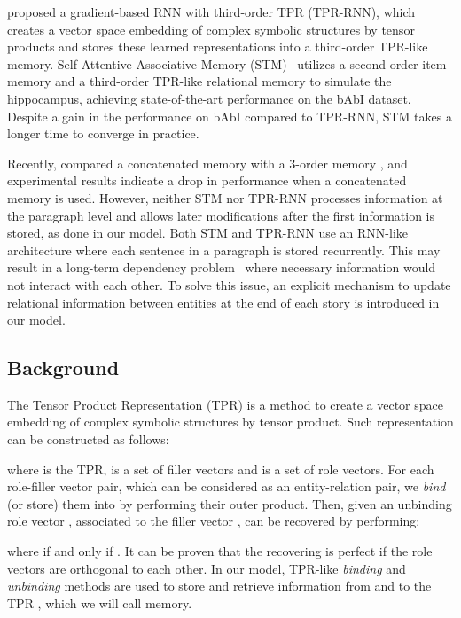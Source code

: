 \documentclass[letterpaper]{article} \usepackage{aaai22}  \usepackage{times}  \usepackage{helvet}  \usepackage{courier}  \usepackage[hyphens]{url}  \usepackage{graphicx} \urlstyle{rm} \def\UrlFont{\rm}  \usepackage{natbib}  \usepackage{caption} \DeclareCaptionStyle{ruled}{labelfont=normalfont,labelsep=colon,strut=off} \frenchspacing  \setlength{\pdfpagewidth}{8.5in}  \setlength{\pdfpageheight}{11in}  \usepackage{algorithm}
\begin{document}
\citet{schlag2018learning} proposed a gradient-based RNN with third-order TPR (TPR-RNN), which creates a vector space embedding of complex symbolic structures by tensor products and stores these learned representations into a third-order TPR-like memory. 
Self-Attentive Associative Memory (STM)~\cite{le2020self} utilizes a second-order item memory and a third-order TPR-like relational memory to simulate the hippocampus, achieving state-of-the-art performance on the bAbI dataset.
Despite a gain in the performance on bAbI compared to TPR-RNN, STM takes a longer time to converge in practice.

Recently, \citet{schlag2020learning} compared a concatenated memory  with a 3-order memory , and experimental results indicate a drop in performance when a concatenated memory is used. 
However, neither STM nor TPR-RNN processes information at the paragraph level and allows later modifications after the first information is stored, as done in our model. 
Both STM and TPR-RNN use an RNN-like architecture where each sentence in a paragraph is stored recurrently. This may result in a long-term dependency problem~\cite{vaswani2017attention} where necessary information would not interact with each other. 
To solve this issue, an explicit mechanism to update relational information between entities at the end of each story
is introduced in our model.
 \subsection{Background}

The Tensor Product Representation (TPR) is a method to create a vector space embedding of complex symbolic structures by tensor product. 
Such representation can be constructed as follows:

where  is the TPR,  is a set of  filler vectors and  is a set of  role vectors. 
For each role-filler vector pair, which can be considered as an entity-relation pair, we \textit{bind} (or store) them into  by performing their outer product. 
Then, given an unbinding role vector ,
associated to the filler vector ,  can be recovered by performing:

where  if and only if . It can be proven that the recovering is perfect if the role vectors are orthogonal to each other.
In our model, TPR-like \textit{binding}  and \textit{unbinding} methods are used to store and retrieve information from and to the TPR , which we will call memory.
 
\end{document}
